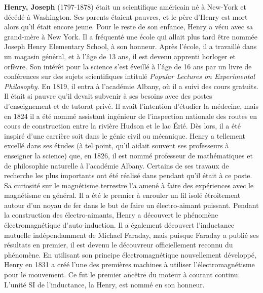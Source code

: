 \textbf{Henry, Joseph} (1797-1878) était un scientifique américain né à New-York et décédé à Washington. Ses parents étaient pauvres, et le père d'Henry est mort alors qu'il était encore jeune. Pour le reste de son enfance, Henry a vécu avec sa grand-mère à New York. Il a fréquenté une école qui allait plus tard être nommée Joseph Henry Elementary School, à son honneur. Après l'école, il a travaillé dans un magasin général, et à l'âge de 13 ans, il est devenu apprenti horloger et orfèvre. Son intérêt pour la science s'est éveillé à l'âge de 16 ans par un livre de conférences sur des sujets scientifiques intitulé \textit{Popular Lectures on Experimental Philosophy}. En 1819, il entra à l'académie Albany, où il a suivi des cours gratuits. Il était si pauvre qu'il devait subvenir à ses besoins avec des postes d'enseignement et de tutorat privé. Il avait l'intention d'étudier la médecine, mais en 1824 il a été nommé assistant ingénieur de l'inspection nationale des routes en cours de construction entre la rivière Hudson et le lac Érié. Dès lors, il a été inspiré d'une carrière soit dans le génie civil ou mécanique. Henry a tellement excellé dans ses études (à tel point, qu'il aidait souvent ses professeurs à enseigner la science) que, en 1826, il est nommé professeur de mathématiques et de philosophie naturelle à l'académie Albany. Certains de ses travaux de recherche les plus importants ont été réalisé dans pendant qu'il était à ce poste. Sa curiosité sur le magnétisme terrestre l'a amené à faire des expériences avec le magnétisme en général. Il a été le premier à enrouler un fil isolé étroitement autour d'un noyau de fer dans le but de faire un électro-aimant puissant. Pendant la construction des électro-aimants, Henry a découvert le phénomène électromagnétique d'auto-induction. Il a également découvert l'inductance mutuelle indépendamment de Michael Faraday, mais puisque Faraday a publié ses résultats en premier, il est devenu le découvreur officiellement reconnu du phénomène. En utilisant son principe électromagnétique nouvellement développé, Henry en 1831 a créé l'une des premières machines à utiliser l'électromagnétisme pour le mouvement. Ce fut le premier ancêtre du moteur à courant continu. L'unité SI de l'inductance, la Henry, est nommé en son honneur.


